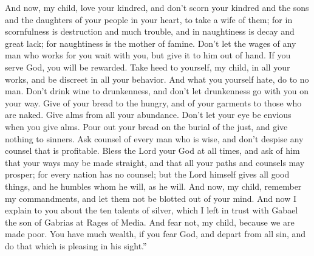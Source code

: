{And now, my child, love your kindred, and don’t scorn your kindred and the sons and the daughters of your people in your heart, to take a wife of them; for in scornfulness is destruction and much trouble, and in naughtiness is decay and great lack; for naughtiness is the mother of famine.
Don’t let the wages of any man who works for you wait with you, but give it to him out of hand. If you serve God, you will be rewarded. Take heed to yourself, my child, in all your works, and be discreet in all your behavior.
And what you yourself hate, do to no man. Don’t drink wine to drunkenness, and don’t let drunkenness go with you on your way.
Give of your bread to the hungry, and of your garments to those who are naked. Give alms from all your abundance. Don’t let your eye be envious when you give alms.
Pour out your bread on the burial of the just, and give nothing to sinners.
Ask counsel of every man who is wise, and don’t despise any counsel that is profitable.
Bless the Lord your God at all times, and ask of him that your ways may be made straight, and that all your paths and counsels may prosper; for every nation has no counsel; but the Lord himself gives all good things, and he humbles whom he will, as he will. And now, my child, remember my commandments, and let them not be blotted out of your mind.
And now I explain to you about the ten talents of silver, which I left in trust with Gabael the son of Gabrias at Rages of Media.
And fear not, my child, because we are made poor. You have much wealth, if you fear God, and depart from all sin, and do that which is pleasing in his sight.”

}
